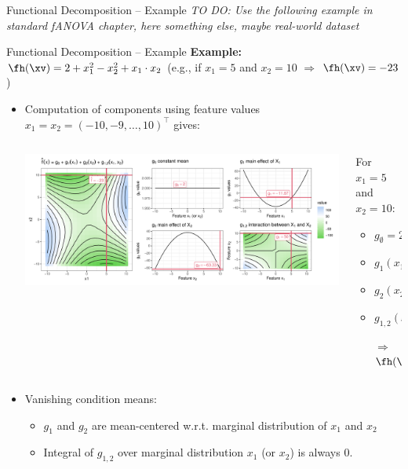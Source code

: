 \documentclass[11pt,compress,t,notes=noshow, aspectratio=169, xcolor=table]{beamer}
\newcommand{\open}{}
\newcommand{\close}{}
\begin{document}
\begin{frame}{Functional Decomposition -- Example}
\textit{TO DO: Use the following example in standard fANOVA chapter, here something else, maybe real-world dataset}
\end{frame}

\begin{frame}{Functional Decomposition -- Example}
\textbf{Example:} $\fh(\xv) = 2 + x_1^2 - x_2^2 + x_1 \cdot x_2$ (e.g., if $x_1 = 5$ and $x_2 = 10$ $\Rightarrow$ $\fh(\xv) = -23$)

\begin{itemize}
    \item Computation of components using feature values $x_1 = x_2 = (-10, -9, \ldots, 10)^\top$ gives:
    \begin{columns}[c, totalwidth=\linewidth]
    \begin{column}{0.75\textwidth}
        \includegraphics[width = \textwidth]{figure/decomposition}
    \end{column}
    \begin{column}{0.25\textwidth}
    For $x_1 = 5$ and $x_2 = 10$:\\
    \begin{itemize}
        \item $g_{\open \emptyset \close} = 2$
        \item $g_{\open 1 \close}(x_1) = -9.67$
        \item $g_{\open 2 \close}(x_2) = -65.33$
        \item $g_{\open 1,2 \close}(x_1, x_2) = 50$
        \item[$\Rightarrow$] $\fh(\xv) = -23$
    \end{itemize}
    \end{column}
    \end{columns}
\pause
    \item Vanishing condition means:
    \begin{itemize}
        \item $g_1$ and $g_2$ are mean-centered w.r.t. marginal distribution of $x_1$ and $x_2$
        \item Integral of $g_{1,2}$ over marginal distribution $x_1$ (or $x_2$) is always 0.
    \end{itemize}
\end{itemize} 
\end{frame}
\end{document}

